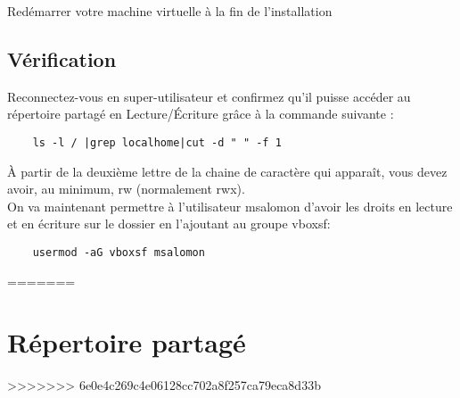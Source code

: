 Redémarrer votre machine virtuelle à la fin de l'installation

\section{Vérification}

Reconnectez-vous en super-utilisateur et confirmez qu'il puisse accéder au répertoire partagé en Lecture/Écriture grâce à la commande suivante :

\begin{lstlisting}
	ls -l / |grep localhome|cut -d " " -f 1
\end{lstlisting}

À partir de la deuxième lettre de la chaine de caractère qui apparaît, vous devez avoir, au minimum, rw (normalement rwx).\\

On va maintenant permettre à l'utilisateur msalomon d'avoir les droits en lecture et en écriture sur le dossier en l'ajoutant au groupe vboxsf:

\begin{lstlisting}
	usermod -aG vboxsf msalomon
\end{lstlisting}

=======
\chapter{Répertoire partagé}
>>>>>>> 6e0e4c269c4e06128cc702a8f257ca79eca8d33b
